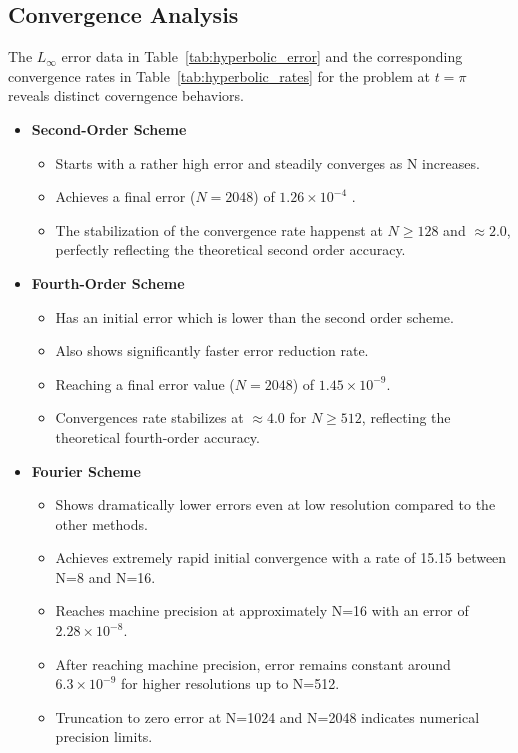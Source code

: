 \subsection{Convergence Analysis}
The $L_\infty$ error data in Table~\ref{tab:hyperbolic_error} and the corresponding convergence rates in Table~\ref{tab:hyperbolic_rates} for the problem at $t = \pi$ reveals distinct coverngence behaviors.
\begin{itemize}
	\item \textbf{Second-Order Scheme}
	      \begin{itemize}
		      \item Starts with a rather high error and steadily converges as N increases.
		      \item Achieves a final error ($N=2048$) of $1.26 \times 10^{-4}$ .
		      \item The stabilization of the convergence rate happenst at $N \geq 128$ and $\approx 2.0$, perfectly reflecting the theoretical second order accuracy.
	      \end{itemize}
	\item \textbf{Fourth-Order Scheme}
	      \begin{itemize}
		      \item Has an initial error which is lower than the second order scheme.
		      \item Also shows significantly faster error reduction rate.
		      \item Reaching a final error value ($N=2048$) of $1.45 \times 10^{-9}$.
		      \item Convergences rate stabilizes at $\approx 4.0$ for $N \geq 512$, reflecting the theoretical fourth-order accuracy.
	      \end{itemize}
		  \item \textbf{Fourier Scheme}
      \begin{itemize}
              \item Shows dramatically lower errors even at low resolution compared to the other methods.
              \item Achieves extremely rapid initial convergence with a rate of 15.15 between N=8 and N=16.
              \item Reaches machine precision at approximately N=16 with an error of $2.28 \times 10^{-8}$.
              \item After reaching machine precision, error remains constant around $6.3 \times 10^{-9}$ for higher resolutions up to N=512.
              \item Truncation to zero error at N=1024 and N=2048 indicates numerical precision limits.
      \end{itemize}
\end{itemize}
